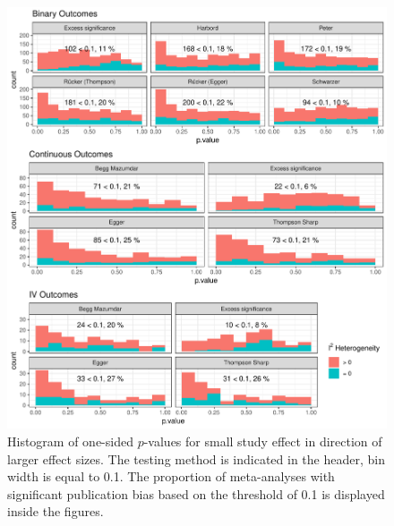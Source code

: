 \documentclass[11pt,a4paper,twoside]{book}\usepackage[]{graphicx}\usepackage[]{color}
\newenvironment{knitrout}{}{} %
\begin{document}
\begin{figure}
\begin{knitrout}
\color{fgcolor}

{\centering \includegraphics[width=\textwidth-3cm]{figure/ch03_figunnamed-chunk-13-1} 

}



\end{knitrout}
\caption{Histogram of one-sided $p$-values for small study effect in direction of larger effect sizes. The testing method is indicated in the header, bin width is equal to 0.1. The proportion of meta-analyses with significant publication bias based on the threshold of 0.1 is displayed inside the figures.}
\label{fig:test}
\end{figure}
\end{document}
